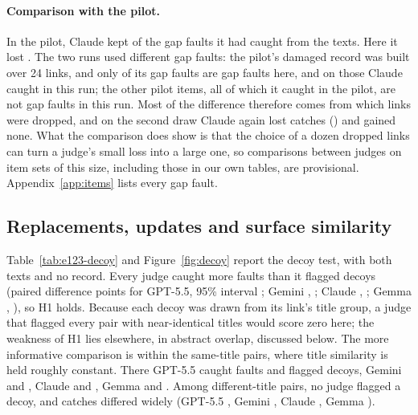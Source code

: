 \paragraph{Comparison with the pilot.} In the pilot, Claude kept \RfcDeferWithStatusDamagedClaudeOpusFourFive{} of the
\RfcDeferOwnStatusDamagedClaudeOpusFourFive{} gap faults it had caught from the texts. Here it lost
\EOpusHTwoaLost. The two runs used different gap faults: the pilot's damaged record was built over 24 links, and only
\EOpusPilotShared{} of its \EOpusPilotPilotItems{} gap faults are gap faults here, and on those Claude caught
\EOpusPilotSharedCaught{} in this run; the other \EOpusPilotPilotOnly{} pilot items, all of which it caught in the pilot, are not
gap faults in this run. Most of the difference therefore comes from which links were dropped, and on the second draw
Claude again lost catches (\EOpusSOneLost) and gained none. What the comparison does show is that the choice of a dozen dropped links can turn a judge's small loss into a large one, so comparisons between judges on item
sets of this size, including those in our own tables, are provisional.
Appendix~\ref{app:items} lists every gap fault.

\subsection{Replacements, updates and surface similarity}
\label{sec:res-shortcut}

Table~\ref{tab:e123-decoy} and Figure~\ref{fig:decoy} report the decoy test, with both texts and no record. Every judge caught more
faults than it flagged decoys (paired difference \EGPTHOne{} points for GPT-5.5, 95\% interval \EGPTHOneCI; Gemini
\EGeminiHOne, \EGeminiHOneCI; Claude \EOpusHOne, \EOpusHOneCI; Gemma \EGemmaHOne, \EGemmaHOneCI), so H1 holds. Because each decoy was
drawn from its link's title group, a judge that flagged every pair with near-identical titles would score zero here;
the weakness of H1 lies elsewhere, in abstract overlap, discussed below. The more informative comparison is within
the same-title pairs, where title similarity is held roughly constant. There GPT-5.5 caught \EGPTSameCatch{} faults and flagged \EGPTSameDecoy{}
decoys, Gemini \EGeminiSameCatch{} and \EGeminiSameDecoy, Claude \EOpusSameCatch{} and \EOpusSameDecoy, Gemma \EGemmaSameCatch{} and \EGemmaSameDecoy. Among
different-title pairs, no judge flagged a decoy, and catches differed widely (GPT-5.5 \EGPTDifferentCatch, Gemini \EGeminiDifferentCatch, Claude
\EOpusDifferentCatch, Gemma \EGemmaDifferentCatch).

